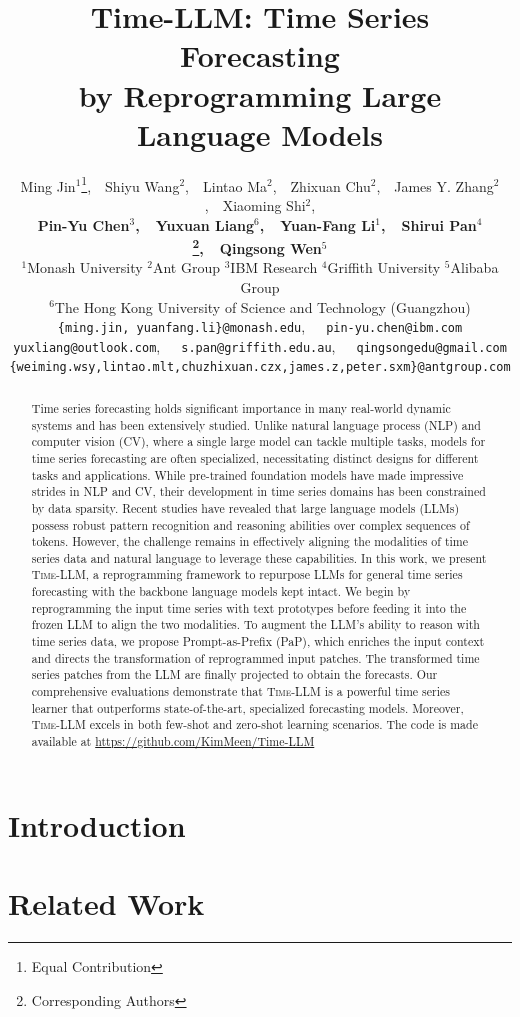 \documentclass{article} %
\title{\icon Time-LLM: Time Series Forecasting \\by Reprogramming Large Language Models}
\author{%
  Ming Jin$^{1}$\thanks{Equal Contribution},\ \ Shiyu Wang$^{2}$\footnotemark[1],\ \ Lintao Ma$^{2}$,\ \ Zhixuan Chu$^{2}$,\ \ James Y. Zhang$^{2}$,\ \ Xiaoming Shi$^{2}$, \\ \textbf{Pin-Yu Chen$^{3}$,\ \ Yuxuan Liang$^{6}$,\ \ Yuan-Fang Li$^{1}$,\ \ Shirui Pan$^{4}$\thanks{Corresponding Authors},\ \ Qingsong Wen$^{5}$\footnotemark[2]
  } \vspace{1mm} \\
  $^{1}$Monash University $^{2}$Ant Group $^{3}$IBM Research $^{4}$Griffith University $^{5}$Alibaba Group
  \\ $^{6}$The Hong Kong University of Science and Technology (Guangzhou)  \vspace{1mm} \\
  \texttt{\small \{ming.jin, yuanfang.li\}@monash.edu},\ \ \ \texttt{\small pin-yu.chen@ibm.com} \\
  \texttt{\small yuxliang@outlook.com},\ \ \ \texttt{\small s.pan@griffith.edu.au},\ \ \  \texttt{\small qingsongedu@gmail.com} \\
  \texttt{\small\{weiming.wsy,lintao.mlt,chuzhixuan.czx,james.z,peter.sxm\}@antgroup.com}
}
\newcommand{\method}{\textsc{Time-LLM}\xspace}
\begin{document}
\maketitle

\vspace{-2mm}
\begin{abstract}
\vspace{-2mm}
Time series forecasting holds significant importance in many real-world dynamic systems and has been extensively studied. Unlike natural language process (NLP) and computer vision (CV), where a single large model can tackle multiple tasks, models for time series forecasting are often specialized, necessitating distinct designs for different tasks and applications. While pre-trained foundation models have made impressive strides in NLP and CV, their development in time series domains has been constrained by data sparsity. Recent studies have revealed that large language models (LLMs) possess robust pattern recognition and reasoning abilities over complex sequences of tokens. However, the challenge remains in effectively aligning the modalities of time series data and natural language to leverage these capabilities. In this work, we present \method, a reprogramming framework to repurpose LLMs for general time series forecasting with the backbone language models kept intact. We begin by reprogramming the input time series with text prototypes before feeding it into the frozen LLM to align the two modalities. To augment the LLM's ability to reason with time series data, we propose Prompt-as-Prefix (PaP), which enriches the input context and directs the transformation of reprogrammed input patches. The transformed time series patches from the LLM are finally projected to obtain the forecasts. Our comprehensive evaluations demonstrate that \method is a powerful time series learner that outperforms state-of-the-art, specialized forecasting models. Moreover, \method excels in both few-shot and zero-shot learning scenarios. The code is made available at \url{https://github.com/KimMeen/Time-LLM}
\end{abstract}

\vspace{-2mm}
\section{Introduction}
\vspace{-2mm}


\vspace{-1mm}
\section{Related Work}
\vspace{-2mm}

\end{document}
